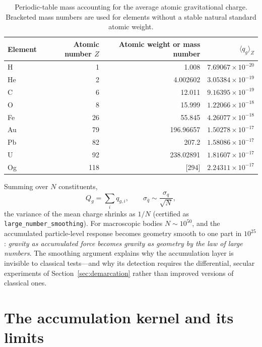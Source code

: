 \documentclass[11pt]{article}
\theoremstyle{remark}
\begin{document}
\begin{table}[htbp]
\centering
\small
\caption{Periodic-table mass accounting for the average atomic gravitational charge. Bracketed mass numbers are used for elements without a stable natural standard atomic weight.}
\label{tab:periodiccharge}
\begin{tabular}{lrrr}
\toprule
Element & Atomic number $Z$ & Atomic weight or mass number & $\langle q_g\rangle_Z$ \\
\midrule
H  & 1   & 1.008     & $7.69067\times 10^{-20}$ \\
He & 2   & 4.002602  & $3.05384\times 10^{-19}$ \\
C  & 6   & 12.011    & $9.16395\times 10^{-19}$ \\
O  & 8   & 15.999    & $1.22066\times 10^{-18}$ \\
Fe & 26  & 55.845    & $4.26077\times 10^{-18}$ \\
Au & 79  & 196.96657 & $1.50278\times 10^{-17}$ \\
Pb & 82  & 207.2     & $1.58086\times 10^{-17}$ \\
U  & 92  & 238.02891 & $1.81607\times 10^{-17}$ \\
Og & 118 & [294]     & $2.24311\times 10^{-17}$ \\
\bottomrule
\end{tabular}
\end{table}

Summing over $N$ constituents,
\begin{equation}
Q_g = \sum_i q_{g,i}, \qquad \sigma_{\bar{q}} \sim \frac{\sigma_q}{\sqrt{N}},
\label{eq:smoothing}
\end{equation}
the variance of the mean charge shrinks as $1/N$ (certified as \texttt{large\_number\_smoothing}). For macroscopic bodies $N \sim 10^{50}$, and the accumulated particle-level response becomes geometry smooth to one part in $10^{25}$: \emph{gravity as accumulated force becomes gravity as geometry by the law of large numbers}. The smoothing argument explains why the accumulation layer is invisible to classical tests---and why its detection requires the differential, secular experiments of Section~\ref{sec:demarcation} rather than improved versions of classical ones.

\section{The accumulation kernel and its limits}
\label{sec:kernel}
\end{document}
